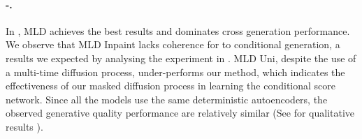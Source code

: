 \paragraph{\mnist-\svhn.} 
In , \gls{MLD} achieves the best results and dominates cross generation performance. We observe that \gls{MLD Inpaint} lacks coherence for \svhn to \mnist conditional generation, a results we expected by analysing the experiment in . \gls{MLD Uni}, despite the use of a multi-time diffusion process, under-performs our method, which indicates the effectiveness of our masked diffusion process in learning the conditional score network. Since all the models use the same deterministic autoencoders, the observed generative quality performance are relatively similar (See  for qualitative results ).


\begin{table}[h]
\caption{Generation Coherence and Quality for MNIST-SVHN (M is for MNIST and S for SVHN ). The generation quality is measured in terms of FMD for MNIST and FID for SVHN.\newline}
 \label{coh_quality:ms_detailed_mld}
\centering
{}
\end{table}






